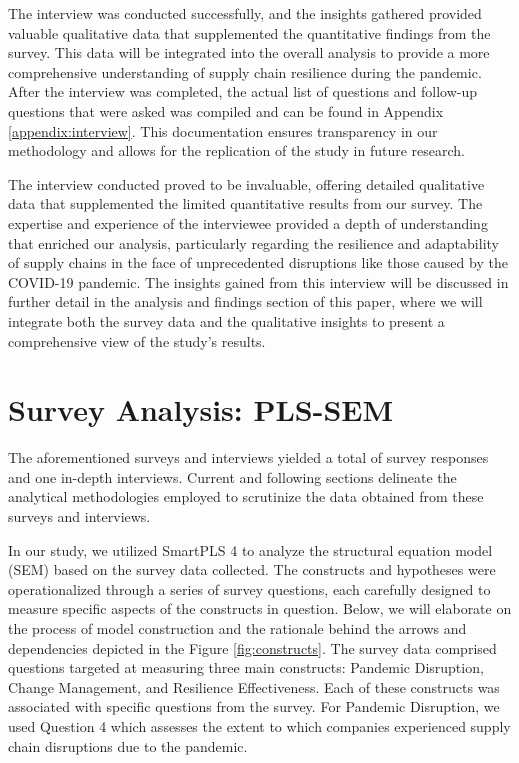 The interview was conducted successfully, and the insights gathered provided valuable qualitative data that supplemented the quantitative findings from the survey. This data will be integrated into the overall analysis to provide a more comprehensive understanding of supply chain resilience during the pandemic. After the interview was completed, the actual list of questions and follow-up questions that were asked was compiled and can be found in Appendix \ref{appendix:interview}. This documentation ensures transparency in our methodology and allows for the replication of the study in future research. 

The interview conducted proved to be invaluable, offering detailed qualitative data that supplemented the limited quantitative results from our survey. The expertise and experience of the interviewee provided a depth of understanding that enriched our analysis, particularly regarding the resilience and adaptability of supply chains in the face of unprecedented disruptions like those caused by the COVID-19 pandemic. The insights gained from this interview will be discussed in further detail in the analysis and findings section of this paper, where we will integrate both the survey data and the qualitative insights to present a comprehensive view of the study's results.


\section{Survey Analysis: PLS-SEM}
\label{sec:pls-sem}

The aforementioned surveys and interviews yielded a total of \participantCount{} survey responses and one in-depth interviews. Current and following sections delineate the analytical methodologies employed to scrutinize the data obtained from these surveys and interviews.

In our study, we utilized SmartPLS 4 \parencite{smartpls2024} to analyze the structural equation model (SEM) based on the survey data collected. The constructs and hypotheses were operationalized through a series of survey questions, each carefully designed to measure specific aspects of the constructs in question. Below, we will elaborate on the process of model construction and the rationale behind the arrows and dependencies depicted in the Figure \ref{fig:constructs}. The survey data comprised questions targeted at measuring three main constructs: Pandemic Disruption, Change Management, and Resilience Effectiveness. Each of these constructs was associated with specific questions from the survey. For Pandemic Disruption, we used Question 4 which assesses the extent to which companies experienced supply chain disruptions due to the pandemic. 

